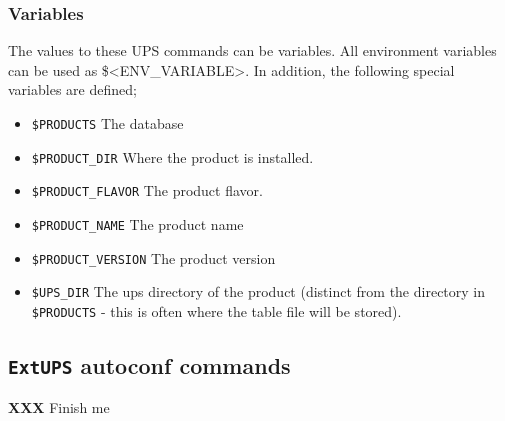 \documentclass{article}
\newcommand{\XXX}[1]{\textbf{XXX} #1}
\newcommand{\code}[1]{\texttt{#1}}
\newcommand{\eups}{\code{ExtUPS}}
\begin{document}
\subsubsection{Variables}

The values to these UPS commands can be variables. All environment
variables can be used as \${<ENV\_VARIABLE>}. In addition, the following special
variables are defined;

\begin{itemize}
  \item \code{\${PRODUCTS}}
    The database
    
  \item \code{\${PRODUCT\_DIR}}
    Where the product is installed.
    
  \item \code{\${PRODUCT\_FLAVOR}}
    The product flavor.
    
  \item \code{\${PRODUCT\_NAME}}
    The product name
    
  \item \code{\${PRODUCT\_VERSION}}
    The product version
    
  \item \code{\${UPS\_DIR}}
    The ups directory of the product (distinct from the directory
    in \code{\$PRODUCTS} - this is often where the table file will be stored).
\end{itemize}

\subsection{\eups{} autoconf commands}
\label{autoconfReference}

\XXX{Finish me}
\end{document}

